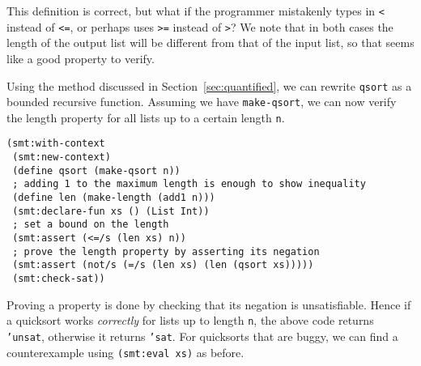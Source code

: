 This definition is correct, but what if the programmer mistakenly types in
\texttt{<} instead of \texttt{<=}, or perhaps uses \texttt{>=} instead of
\texttt{>}? We note that in both cases the length of the output list will be
different from that of the input list, so that seems like a good property to
verify.

Using the method discussed in Section~\ref{sec:quantified}, we can rewrite
\texttt{qsort} as a bounded recursive function. Assuming we have \texttt
{make-qsort}, we can now verify the length property for all lists up to a
certain length \texttt{n}.

\begin{verbatim}
(smt:with-context
 (smt:new-context)
 (define qsort (make-qsort n))
 ; adding 1 to the maximum length is enough to show inequality
 (define len (make-length (add1 n)))
 (smt:declare-fun xs () (List Int))
 ; set a bound on the length
 (smt:assert (<=/s (len xs) n))
 ; prove the length property by asserting its negation
 (smt:assert (not/s (=/s (len xs) (len (qsort xs)))))
 (smt:check-sat))
\end{verbatim}

Proving a property is done by checking that its negation is unsatisfiable.
Hence if a quicksort works \textit{correctly} for lists up to length
\texttt{n}, the above code returns \texttt{'unsat}, otherwise it returns
\texttt{'sat}. For quicksorts that are buggy, we can find a counterexample
using \texttt{(smt:eval xs)} as before.
